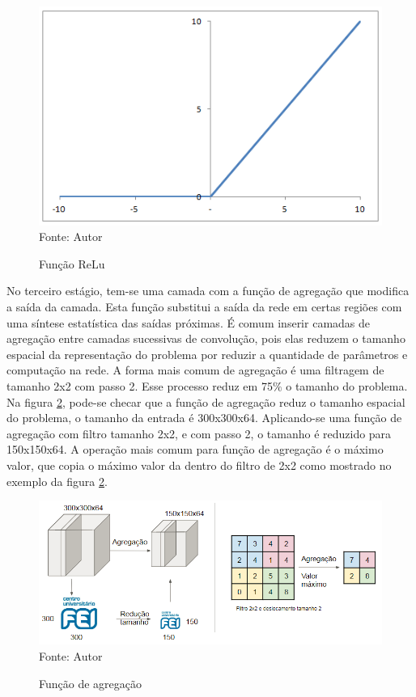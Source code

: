 \documentclass[
	12pt,				%
    oneside,			%
	a4paper,			%
	english,			%
	french,				%
	spanish,			%
	brazil,				%
	]{abntex2}
\begin{document}
\begin{figure}[H]
    \centering
    \caption{Função ReLu}
    \includegraphics[scale=0.75]{ReLu}\\
    Fonte: Autor\hfill
    \label{fig:relu}
\end{figure} 

No terceiro estágio, tem-se uma camada com a função de agregação que modifica a saída da camada. Esta função substitui a saída da rede em certas regiões com uma síntese estatística das saídas próximas. É comum inserir camadas de agregação entre camadas sucessivas de convolução, pois elas reduzem o tamanho espacial da representação do problema por reduzir a quantidade de parâmetros e computação na rede. A forma mais comum de agregação é uma filtragem de tamanho 2x2 com passo 2. Esse processo reduz em 75$\%$ o tamanho do problema. Na figura \ref{fig:pooling}, pode-se checar que a função de agregação reduz o tamanho espacial do problema, o tamanho da entrada é 300x300x64. Aplicando-se uma função de agregação com filtro tamanho 2x2, e com passo 2, o tamanho é reduzido para 150x150x64. A operação mais comum para função de agregação é o máximo valor, que copia o máximo valor da dentro do filtro de 2x2 como mostrado no exemplo da figura \ref{fig:pooling}.


\begin{figure}[H]
    \centering
    \caption{Função de agregação}
    \includegraphics[width=\textwidth]{pooling1}\\
    Fonte: Autor\hfill
    \label{fig:pooling}
\end{figure} 
\end{document}
